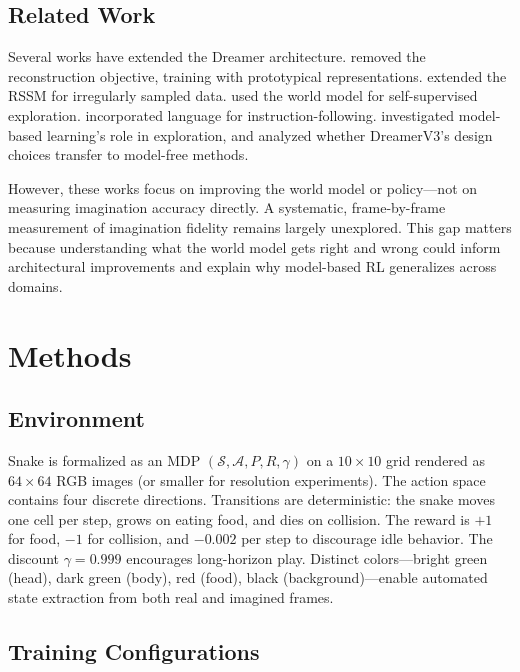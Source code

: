 \documentclass[letterpaper]{article}
\begin{document}
\subsection{Related Work}

Several works have extended the Dreamer architecture. \citet{deng2022dreamerpro} removed the reconstruction objective, training with prototypical representations. \citet{zhang2023oderssm} extended the RSSM for irregularly sampled data. \citet{sekar2020plan2explore} used the world model for self-supervised exploration. \citet{lin2024dynalang} incorporated language for instruction-following. \citet{walker2023modelbased} investigated model-based learning's role in exploration, and \citet{sullivan2023rewardscale} analyzed whether DreamerV3's design choices transfer to model-free methods.

However, these works focus on improving the world model or policy---not on measuring imagination accuracy directly. A systematic, frame-by-frame measurement of imagination fidelity remains largely unexplored. This gap matters because understanding what the world model gets right and wrong could inform architectural improvements and explain why model-based RL generalizes across domains.


\section{Methods}

\subsection{Environment}

Snake is formalized as an MDP $(\mathcal{S}, \mathcal{A}, P, R, \gamma)$ on a $10 \times 10$ grid rendered as $64 \times 64$ RGB images (or smaller for resolution experiments). The action space contains four discrete directions. Transitions are deterministic: the snake moves one cell per step, grows on eating food, and dies on collision. The reward is $+1$ for food, $-1$ for collision, and $-0.002$ per step to discourage idle behavior. The discount $\gamma = 0.999$ encourages long-horizon play. Distinct colors---bright green (head), dark green (body), red (food), black (background)---enable automated state extraction from both real and imagined frames.

\subsection{Training Configurations}
\end{document}
